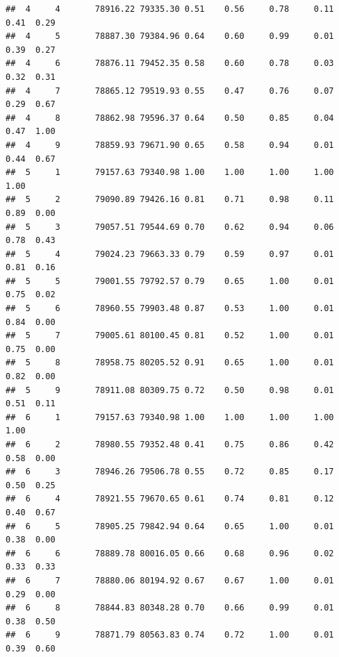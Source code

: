 \documentclass[
  english,
  man]{apa6}
\begin{document}
\begin{verbatim}
##  4     4       78916.22 79335.30 0.51    0.56     0.78     0.11  0.41  0.29  
##  4     5       78887.30 79384.96 0.64    0.60     0.99     0.01  0.39  0.27  
##  4     6       78876.11 79452.35 0.58    0.60     0.78     0.03  0.32  0.31  
##  4     7       78865.12 79519.93 0.55    0.47     0.76     0.07  0.29  0.67  
##  4     8       78862.98 79596.37 0.64    0.50     0.85     0.04  0.47  1.00  
##  4     9       78859.93 79671.90 0.65    0.58     0.94     0.01  0.44  0.67  
##  5     1       79157.63 79340.98 1.00    1.00     1.00     1.00  1.00        
##  5     2       79090.89 79426.16 0.81    0.71     0.98     0.11  0.89  0.00  
##  5     3       79057.51 79544.69 0.70    0.62     0.94     0.06  0.78  0.43  
##  5     4       79024.23 79663.33 0.79    0.59     0.97     0.01  0.81  0.16  
##  5     5       79001.55 79792.57 0.79    0.65     1.00     0.01  0.75  0.02  
##  5     6       78960.55 79903.48 0.87    0.53     1.00     0.01  0.84  0.00  
##  5     7       79005.61 80100.45 0.81    0.52     1.00     0.01  0.75  0.00  
##  5     8       78958.75 80205.52 0.91    0.65     1.00     0.01  0.82  0.00  
##  5     9       78911.08 80309.75 0.72    0.50     0.98     0.01  0.51  0.11  
##  6     1       79157.63 79340.98 1.00    1.00     1.00     1.00  1.00        
##  6     2       78980.55 79352.48 0.41    0.75     0.86     0.42  0.58  0.00  
##  6     3       78946.26 79506.78 0.55    0.72     0.85     0.17  0.50  0.25  
##  6     4       78921.55 79670.65 0.61    0.74     0.81     0.12  0.40  0.67  
##  6     5       78905.25 79842.94 0.64    0.65     1.00     0.01  0.38  0.00  
##  6     6       78889.78 80016.05 0.66    0.68     0.96     0.02  0.33  0.33  
##  6     7       78880.06 80194.92 0.67    0.67     1.00     0.01  0.29  0.00  
##  6     8       78844.83 80348.28 0.70    0.66     0.99     0.01  0.38  0.50  
##  6     9       78871.79 80563.83 0.74    0.72     1.00     0.01  0.39  0.60
\end{verbatim}
\end{document}
